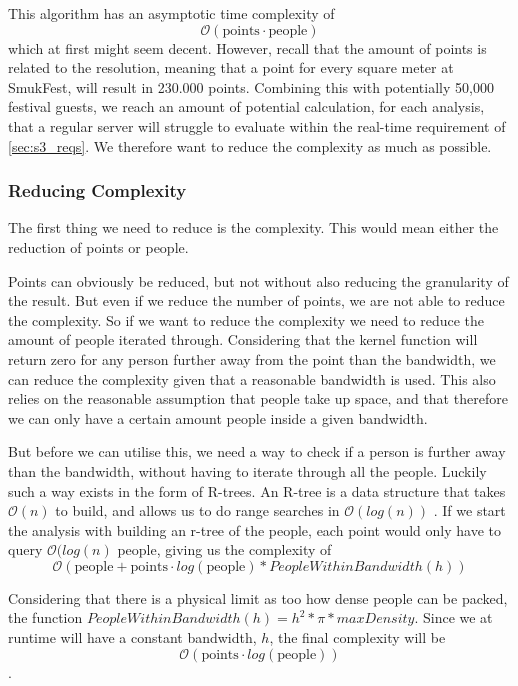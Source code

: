 This algorithm has an asymptotic time complexity of $$\mathcal{O}(\text{points} \cdot \text{people})$$ which at first might seem decent. However, recall that the amount of points is related to the resolution, meaning that a point for every square meter at SmukFest, will result in 230.000 points\cite{smukFacts}. Combining this with potentially 50,000 festival guests\cite{smukFacts}, we reach an amount of potential calculation, for each analysis, that a regular server will struggle to evaluate within the real-time requirement of \cref{sec:s3_reqs}. We therefore want to reduce the complexity as much as possible.


\subsubsection{Reducing Complexity}

The first thing we need to reduce is the complexity. This would mean either the reduction of points or people.

Points can obviously be reduced, but not without also reducing the granularity of the result. But even if we reduce the number of points, we are not able to reduce the complexity. So if we want to reduce the complexity we need to reduce the amount of people iterated through. Considering that the kernel function will return zero for any person further away from the point than the bandwidth, we can reduce the complexity given that a reasonable bandwidth is used. This also relies on the reasonable assumption that people take up space, and that therefore we can only have a certain amount people inside a given bandwidth.

But before we can utilise this, we need a way to check if a person is further away than the bandwidth, without having to iterate through all the people. Luckily such a way exists in the form of R-trees. An R-tree is a data structure that takes $\mathcal{O}(n)$ to build, and allows us to do range searches in $\mathcal{O}(log(n))$ \cite{rtree}. If we start the analysis with building an r-tree of the people, each point would only have to query $\mathcal{O}(log(n)$ people, giving us the complexity of $$\mathcal{O}(\text{people} + \text{points} \cdot log(\text{people}) * PeopleWithinBandwidth(h))$$

Considering that there is a physical limit as too how dense people can be packed, the function $PeopleWithinBandwidth(h) = h^2 * \pi * maxDensity$. Since we at runtime will have a constant bandwidth, $h$, the final complexity will be $$\mathcal{O}(\text{points} \cdot log(\text{people}))$$.

